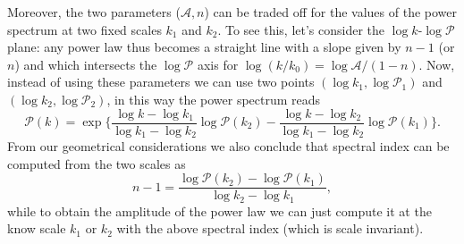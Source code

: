 Moreover, the two parameters ($\mathcal A, n$) can be traded off for the values of the power spectrum at two fixed scales $k_1$ and $k_2$. To see this, let's consider the $\log k$-$\log\mathcal P$ plane: any power law thus becomes a straight line with a slope given by $n-1$ (or $n$) and which intersects the $\log\mathcal{P}$ axis for $\log (k/k_0)=\log\mathcal A/(1-n)$. Now, instead of using these parameters we can use two points $(\log k_1,\log\mathcal P_1)$ and $(\log k_2,\log\mathcal P_2)$, in this way the power spectrum reads
\begin{equation}\label{eq:2_scales_PS}
    \mathcal P(k)=\exp\bigg\{\frac{\log k-\log k_1}{\log k_1 -\log k_2}\log\mathcal P(k_2)-\frac{\log k-\log k_2}{\log k_1 -\log k_2}\log\mathcal P(k_1)\bigg\}.
\end{equation}
From our geometrical considerations we also conclude that spectral index can be computed from the two scales as
$$n-1=\frac{\log\mathcal P(k_2)-\log\mathcal P(k_1)}{\log k_2-\log k_1},$$
while to obtain the amplitude of the power law we can just compute it at the know scale $k_1$ or $k_2$ with the above spectral index (which is scale invariant).
